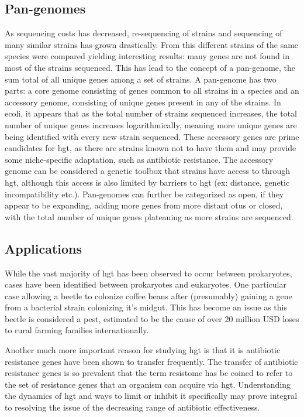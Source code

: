 \subsection{Pan-genomes}%
As sequencing costs has decreased, re-sequencing of strains and sequencing of many similar strains has grown drastically.
From this different strains of the same species were compared yielding interesting results: many genes are not found in most of the strains sequenced\citep{toolpan}.
This has lead to the concept of a pan-genome, the sum total of all unique genes among a set of strains\citep{pang}.
A pan-genome has two parts: a core genome consisting of genes common to all strains in a species and an accessory genome, consisting of unique genes present in any of the strains\citep{pang}.
In \ac{ecoli}, it appears that as the total number of strains sequenced increases, the total number of unique genes increases logarithmically, meaning more unique genes are being identified with every new strain sequenced\citep{ecopan}.
These accessory genes are prime candidates for \ac{hgt}, as there are strains known not to have them and may provide some niche-specific adaptation, such as antibiotic resistance\citep{pang}.
The accessory genome can be considered a genetic toolbox that strains have access to through \ac{hgt}, although this access is also limited by barriers to \ac{hgt} (ex: distance, genetic incompatibility etc.).
Pan-genomes can further be categorized as open, if they appear to be expanding, adding more genes from more distant \ac{otu}s or closed, with the total number of unique genes plateauing as more strains are sequenced\citep{pang}.
\subsection{Applications}
While the vast majority of \ac{hgt} has been observed to occur between prokaryotes, cases have been identified between prokaryotes and eukaryotes.
One particular case allowing a beetle to colonize coffee beans after (presumably) gaining a gene from a bacterial strain colonizing it's midgut\citep{beetle}.
This has become an issue as this beetle is considered a pest, estimated to be the cause of over $20$ million USD loses to rural farming families internationally\citep{beetle}.\par
Another much more important reason for studying \ac{hgt} is that it is antibiotic resistance genes have been shown to transfer frequently\citep{amrhgt}.
The transfer of antibiotic resistance genes is so prevalent that the term resistome has be coined to refer to the set of resistance genes that an organism can acquire via \ac{hgt}\citep{amrhgt}.
Understanding the dynamics of \ac{hgt} and ways to limit or inhibit it specifically may prove integral to resolving the issue of the decreasing range of antibiotic effectiveness\citep{amrhgt}.

